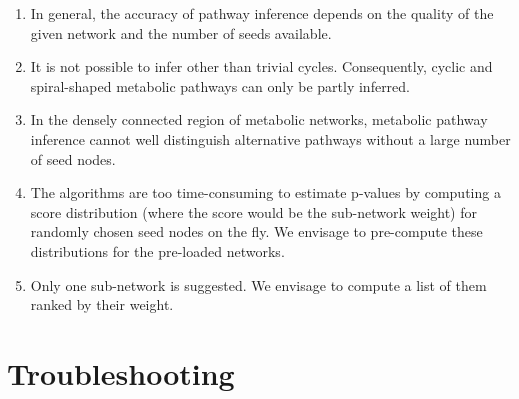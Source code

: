 \begin{enumerate}

\item In general, the accuracy of pathway inference depends on the quality of the given network and the number of seeds available.

\item It is not possible to infer other than trivial cycles. Consequently, cyclic and spiral-shaped metabolic pathways can only be partly
inferred.

\item In the densely connected region of metabolic networks, metabolic pathway inference cannot well distinguish alternative pathways
without a large number of seed nodes.

\item The algorithms are too time-consuming to estimate p-values by computing a score distribution (where the score would be the sub-network weight)
for randomly chosen seed nodes on the fly. We envisage to pre-compute these distributions for the pre-loaded networks.

\item Only one sub-network is suggested. We envisage to compute a list of them ranked by their weight.

\end{enumerate}

\section{Troubleshooting}

